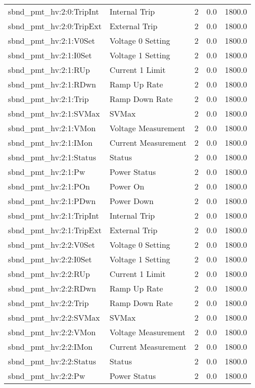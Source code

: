 \begin{center}
\begin{longtable}{l | l l l l }
sbnd\_pmt\_hv:2:0:TripInt & Internal Trip & 2 & 0.0 & 1800.0\\ 
sbnd\_pmt\_hv:2:0:TripExt & External Trip & 2 & 0.0 & 1800.0\\ 
sbnd\_pmt\_hv:2:1:V0Set & Voltage 0 Setting & 2 & 0.0 & 1800.0\\ 
sbnd\_pmt\_hv:2:1:I0Set & Voltage 1 Setting & 2 & 0.0 & 1800.0\\ 
sbnd\_pmt\_hv:2:1:RUp & Current 1 Limit & 2 & 0.0 & 1800.0\\ 
sbnd\_pmt\_hv:2:1:RDwn & Ramp Up Rate & 2 & 0.0 & 1800.0\\ 
sbnd\_pmt\_hv:2:1:Trip & Ramp Down Rate & 2 & 0.0 & 1800.0\\ 
sbnd\_pmt\_hv:2:1:SVMax & SVMax & 2 & 0.0 & 1800.0\\ 
sbnd\_pmt\_hv:2:1:VMon & Voltage Measurement & 2 & 0.0 & 1800.0\\ 
sbnd\_pmt\_hv:2:1:IMon & Current Measurement & 2 & 0.0 & 1800.0\\ 
sbnd\_pmt\_hv:2:1:Status & Status & 2 & 0.0 & 1800.0\\ 
sbnd\_pmt\_hv:2:1:Pw & Power Status & 2 & 0.0 & 1800.0\\ 
sbnd\_pmt\_hv:2:1:POn & Power On & 2 & 0.0 & 1800.0\\ 
sbnd\_pmt\_hv:2:1:PDwn & Power Down & 2 & 0.0 & 1800.0\\ 
sbnd\_pmt\_hv:2:1:TripInt & Internal Trip & 2 & 0.0 & 1800.0\\ 
sbnd\_pmt\_hv:2:1:TripExt & External Trip & 2 & 0.0 & 1800.0\\ 
sbnd\_pmt\_hv:2:2:V0Set & Voltage 0 Setting & 2 & 0.0 & 1800.0\\ 
sbnd\_pmt\_hv:2:2:I0Set & Voltage 1 Setting & 2 & 0.0 & 1800.0\\ 
sbnd\_pmt\_hv:2:2:RUp & Current 1 Limit & 2 & 0.0 & 1800.0\\ 
sbnd\_pmt\_hv:2:2:RDwn & Ramp Up Rate & 2 & 0.0 & 1800.0\\ 
sbnd\_pmt\_hv:2:2:Trip & Ramp Down Rate & 2 & 0.0 & 1800.0\\ 
sbnd\_pmt\_hv:2:2:SVMax & SVMax & 2 & 0.0 & 1800.0\\ 
sbnd\_pmt\_hv:2:2:VMon & Voltage Measurement & 2 & 0.0 & 1800.0\\ 
sbnd\_pmt\_hv:2:2:IMon & Current Measurement & 2 & 0.0 & 1800.0\\ 
sbnd\_pmt\_hv:2:2:Status & Status & 2 & 0.0 & 1800.0\\ 
sbnd\_pmt\_hv:2:2:Pw & Power Status & 2 & 0.0 & 1800.0\\ 

\end{longtable}
\end{center}
